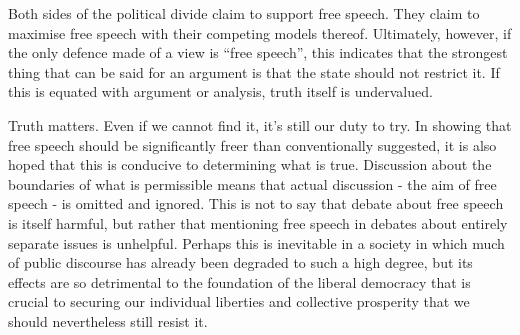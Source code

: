 \documentclass[10pt,a4paper,twoside]{article}
\begin{document}
\begin{multicols}{2}
Both sides of the political divide claim to support free speech. They
claim to maximise free speech with their competing models thereof.
Ultimately, however, if the only defence made of a view is ``free
speech'', this indicates that the strongest thing that can be said for
an argument is that the state should not restrict it. If this is equated
with argument or analysis, truth itself is undervalued.

Truth matters. Even if we cannot find it, it's still our duty to try. In
showing that free speech should be significantly freer than
conventionally suggested, it is also hoped that this is conducive to
determining what is true. Discussion about the boundaries of what is
permissible means that actual discussion - the aim of free speech - is
omitted and ignored. This is not to say that debate about free speech is
itself harmful, but rather that mentioning free speech in debates about
entirely separate issues is unhelpful. Perhaps this is inevitable in a
society in which much of public discourse has already been degraded to
such a high degree, but its effects are so detrimental to the foundation
of the liberal democracy that is crucial to securing our individual
liberties and collective prosperity that we should nevertheless still
resist it.

\end{multicols}
\end{document}
